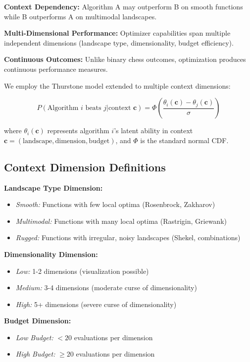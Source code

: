\documentclass[article]{jss}
\begin{document}
\textbf{Context Dependency:} Algorithm A may outperform B on smooth functions while B outperforms A on multimodal landscapes.

\textbf{Multi-Dimensional Performance:} Optimizer capabilities span multiple independent dimensions (landscape type, dimensionality, budget efficiency).

\textbf{Continuous Outcomes:} Unlike binary chess outcomes, optimization produces continuous performance measures.

We employ the Thurstone model \citep{thurstone1927law, bradley1952rank} extended to multiple context dimensions:

\begin{equation}
P(\text{Algorithm } i \text{ beats } j | \text{context } \mathbf{c}) = \Phi\left(\frac{\theta_{i}(\mathbf{c}) - \theta_{j}(\mathbf{c})}{\sigma}\right)
\end{equation}

where $\theta_{i}(\mathbf{c})$ represents algorithm $i$'s latent ability in context $\mathbf{c} = (\text{landscape}, \text{dimension}, \text{budget})$, and $\Phi$ is the standard normal CDF.

\subsection{Context Dimension Definitions}

\textbf{Landscape Type Dimension:}
\begin{itemize}
\item \emph{Smooth:} Functions with few local optima (Rosenbrock, Zakharov)
\item \emph{Multimodal:} Functions with many local optima (Rastrigin, Griewank)
\item \emph{Rugged:} Functions with irregular, noisy landscapes (Shekel, combinations)
\end{itemize}

\textbf{Dimensionality Dimension:}
\begin{itemize}
\item \emph{Low:} 1-2 dimensions (visualization possible)
\item \emph{Medium:} 3-4 dimensions (moderate curse of dimensionality)
\item \emph{High:} 5+ dimensions (severe curse of dimensionality)
\end{itemize}

\textbf{Budget Dimension:}
\begin{itemize}
\item \emph{Low Budget:} $< 20$ evaluations per dimension
\item \emph{High Budget:} $\geq 20$ evaluations per dimension
\end{itemize}
\end{document}
